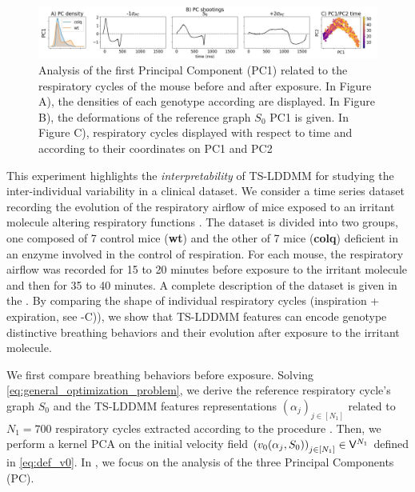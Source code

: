 \begin{figure}[t]
  \centering
  \includegraphics[width=0.95\linewidth]{"./pictures/exp_2.pdf"}
  \vspace{-1em}
  \caption{Analysis of the first Principal Component (PC1) related to the respiratory cycles of the mouse 
  before and after exposure. In Figure A), the densities of each genotype according are displayed. In Figure B), the deformations of the reference graph $S_0$ PC1 is given. In Figure C), respiratory cycles displayed with respect to time and according to their coordinates on PC1 and PC2}
  \label{fig:exp_2_PCA}
  \vspace{-1.5em}
\end{figure}

This experiment highlights the \textit{interpretability} of TS-LDDMM for studying the inter-individual variability in a clinical dataset.
We consider a time series dataset recording the evolution of the respiratory airflow of mice exposed 
to an irritant molecule altering respiratory functions \cite{nervo2019respiratory}. The dataset is divided into two groups, one 
composed of 7 control mice (\textbf{wt}) and the other of 7 mice (\textbf{colq}) deficient in an enzyme 
involved in the control of respiration. For each mouse, the respiratory airflow was recorded for 
15 to 20 minutes before exposure to the irritant molecule and then for 35 to 40 minutes. A complete 
description of the dataset is given in the .
By comparing the shape of individual respiratory cycles (inspiration + expiration, see -C)), 
we show that TS-LDDMM features can encode genotype distinctive breathing behaviors and their evolution 
after exposure to the irritant molecule. 

We first compare breathing behaviors before exposure.
Solving \eqref{eq:general_optimization_problem}, we derive the reference respiratory cycle's graph $S_0$ and the TS-LDDMM features representations 
$(\alpha_j)_{j\in[N_1]}$ related to $N_1=700$ respiratory cycles extracted according 
to the procedure \cite{germain2023unsupervised}.
Then, we perform a kernel PCA on the initial velocity field $\left(v_0(\alpha_j,S_0)\right)_{j\in[N_1]}\in \mathsf{V}^{N_1}$ defined in \eqref{eq:def_v0}.
In , we focus on the analysis of the three Principal Components (PC).

